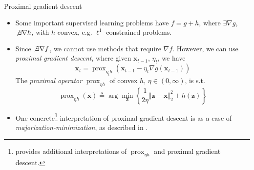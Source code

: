 \documentclass{beamer}
\numberwithin{equation}{section}
\begin{document}
\begin{frame}{Proximal gradient descent}
    \begin{itemize}
        \item
        Some important supervised learning problems have $ f = g + h $, where
        $ \exists\nabla g $, $ \not\exists\nabla h $, with $ h $ convex, e.g.
        $ \ell^1 $-constrained problems.

        \item
        Since $ \not\exists\nabla f $, we cannot use methods that require
        $ \nabla f $. However, we can use \textit{proximal gradient descent},
        where given $ \mathbf{x}_{t - 1} $, $ \eta_t $, we have
        \cite{stat_learn_sparsity}
        \begin{equation} \label{eq:prox_grad_update}
            \mathbf{x}_t = \operatorname{prox}_{\eta_t h}(\mathbf{x}_{t - 1} -
            \eta_t\nabla g(\mathbf{x}_{t - 1}))
        \end{equation}
        The \textit{proximal operator} $ \operatorname{prox}_{\eta h} $ of
        convex $ h $, $ \eta \in (0, \infty) $, is s.t.
        \cite{stat_learn_sparsity}
        \begin{equation} \label{eq:prox_operator}
            \operatorname{prox}_{\eta h}(\mathbf{x}) \triangleq
            \arg\min_\mathbf{z}\left\{
                \frac{1}{2\eta}\Vert\mathbf{z} - \mathbf{x}\Vert_2^2 +
                h(\mathbf{z})
            \right\}
        \end{equation}

        \item
        One concrete\footnote{
            \cite{prox_algos} provides additional interpretations of
            $ \operatorname{prox}_{\eta h} $ and proximal gradient descent.
        } interpretation of proximal gradient descent is as a case of
        \textit{majorization-minimization}, as described in \cite{prox_algos}.
    \end{itemize}

    \medskip
\end{frame}
\end{document}
